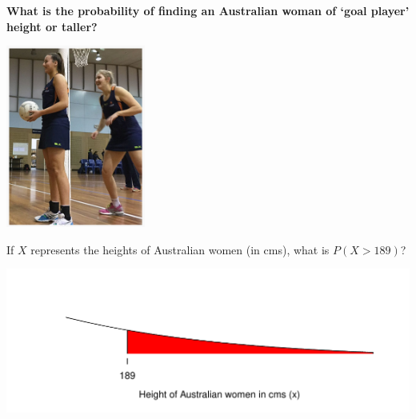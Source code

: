 \documentclass[t,xcolor=pdftex,dvipsnames,table]{beamer}\usepackage[]{graphicx}\usepackage[]{color}
\makeatletter
\def\maxwidth{ %
  \ifdim\Gin@nat@width>\linewidth
    \linewidth
  \else
    \Gin@nat@width
  \fi
}
\newenvironment{knitrout}{}{} %
\makeatother
\begin{document}
\begin{frame}{}

{\bf What is the probability of finding an Australian woman of `goal player' height or taller?}

\begin{center}
\includegraphics[height=6cm]{../images/NetballHeight.jpg}
\end{center}

\end{frame}


\begin{frame}{}

If $X$ represents the heights of Australian women (in cms), what is $P(X > 189)$?

\vspace{1cm}
\begin{knitrout}
\color{fgcolor}
\includegraphics[width=\maxwidth]{figure/unnamed-chunk-76-1} 

\end{knitrout}
\end{frame}
\end{document}
